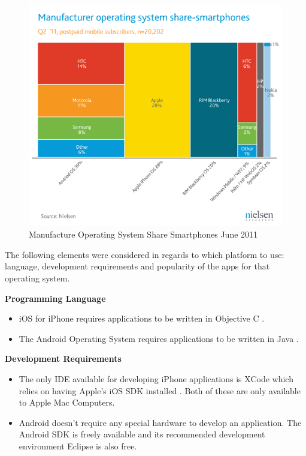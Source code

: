 \begin{figure}[ht]
\begin{center}
\includegraphics[trim = 0mm 20mm 0mm 30mm, clip, scale=0.5]{images/smartphone.png}
\caption{Manufacture Operating System Share Smartphones June 2011 \cite{smartphone}}
\label{fig:Mobile}
\end{center}
\end{figure}

The following elements were considered in regards to which platform to use: language, development requirements and popularity of the apps for that operating system.

\textbf{Programming Language}
\begin{itemize}
	\item{iOS for iPhone requires applications to be written in Objective C \cite{objectivec}.}
	\item{The Android Operating System requires applications to be written in Java \cite{AndroidSDK}.}
\end{itemize}

\textbf{Development Requirements}
\begin{itemize}
	\item{The only IDE available for developing iPhone applications is XCode which relies on having Apple's iOS SDK installed \cite{iOS}. Both of these are only available to Apple Mac Computers.}
	\item{Android doesn't require any special hardware to develop an application. The Android SDK is freely available and its recommended development environment Eclipse \cite{Eclipse} is also free.}
\end{itemize}

